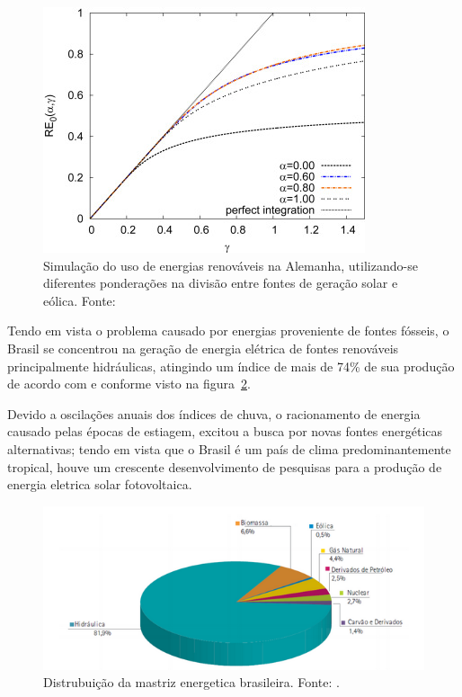 \FloatBarrier
\begin{figure}[htbp]
	\centering
	\includegraphics[scale=1.5]{imagens/wind_solar}
	\caption{Simulação do uso de energias renováveis na Alemanha, utilizando-se diferentes ponderações na divisão entre fontes de geração solar e eólica. Fonte:   }
	
	\label{fig:Wind_sol}
\end{figure}
\FloatBarrier

Tendo em vista o problema causado por energias proveniente de fontes fósseis, o Brasil se concentrou na geração de energia elétrica de fontes renováveis principalmente hidráulicas, atingindo um índice de mais de 74\% de sua produção de acordo com  e conforme visto na figura~\ref{fig:FonteEnergia}.

Devido a oscilações anuais dos índices de chuva, o racionamento de energia causado pelas épocas de estiagem, excitou a busca por novas fontes energéticas alternativas; tendo em vista que o Brasil é um país de clima predominantemente tropical, houve um crescente  desenvolvimento de pesquisas para a produção de energia eletrica solar fotovoltaica. 

\FloatBarrier
\begin{figure}[htbp]
	\centering
	\includegraphics[scale=1]{imagens/FontesEnergia}
	\caption{Distrubuição da mastriz energetica brasileira. Fonte:  . }
	
	\label{fig:FonteEnergia}
\end{figure}
\FloatBarrier

